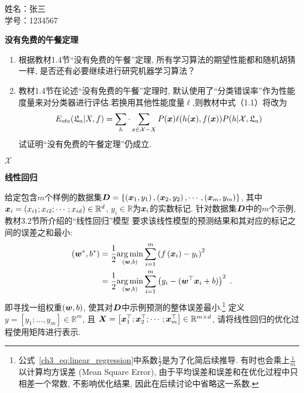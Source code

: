 \documentclass[answers]{exam}  %
\begin{document}
\Large
\noindent 
姓名：张三 \\
学号：1234567 \\
\begin{questions}
\question [20] \textbf{没有免费的午餐定理}

\begin{enumerate}
    \item 根据教材1.4节“没有免费的午餐”定理, 所有学习算法的期望性能都和随机胡猜一样, 是否还有必要继续进行研究机器学习算法？
    \item 教材1.4节在论述“没有免费的午餐”定理时, 默认使用了“分类错误率”作为性能度量来对分类器进行评估.若换用其他性能度量$\ell$,则教材中式（1.1）将改为
    \begin{equation}
        E_{ote}(\mathfrak{L}_a|X,f)=\sum_h \cdot\sum_{x\in\mathcal{X}-X}P({\boldsymbol{x}})\ell(h({\boldsymbol{x}}),f({\boldsymbol{x}}))P(h|\mathcal{X},\mathfrak{L}_a)
    \end{equation}
    试证明“没有免费的午餐定理”仍成立.
\end{enumerate}
	\begin{solution}
    $\mathcal{X}$
	\end{solution}


\question [15] \textbf{线性回归}

给定包含$m$个样例的数据集$\boldsymbol{D}=\left\{\left({\boldsymbol{x}}_{1}, y_{1}\right),\left({\boldsymbol{x}}_{2}, y_{2}\right), \cdots,\left({\boldsymbol{x}}_{m}, y_{m}\right)\right\}$, 其中${\boldsymbol{x}}_{i}=\left(x_{i 1} ; x_{i 2} ; \cdots ; x_{i d}\right) \in \mathbb{R}^{d}$, $y_{i} \in\mathbb{R}$为${\boldsymbol{x}}_{i}$的实数标记.
针对数据集$\boldsymbol{D}$中的$m$个示例, 教材3.2节所介绍的“线性回归”模型 要求该线性模型的预测结果和其对应的标记之间的误差之和最小:
\begin{align}
\left(\boldsymbol{w}^{*}, b^{*}\right) &=\frac{1}{2}\underset{(\boldsymbol{w}, b)}{\arg \min } \sum_{i=1}^{m}\left(f\left({\boldsymbol{x}}_{i}\right)-y_{i}\right)^{2} \notag\\
&=\frac{1}{2}\underset{(\boldsymbol{w}, b)}{\arg \min } \sum_{i=1}^{m}\left(y_{i}-(\boldsymbol{w}^\top {\boldsymbol{x}}_{i}+b)\right)^{2}\;.\label{ch3_eq:linear_regression}
\end{align}
即寻找一组权重$(\boldsymbol{w}, b)$, 使其对$\boldsymbol{D}$中示例预测的整体误差最小.\footnote{公式~\ref{ch3_eq:linear_regression}中系数$\frac{1}{2}$是为了化简后续推导. 有时也会乘上$\frac{1}{m}$以计算均方误差 (Mean Square Error), 由于平均误差和误差和在优化过程中只相差一个常数, 不影响优化结果, 因此在后续讨论中省略这一系数.}
定义$y=\left[y_{1}; \ldots, y_{m}\right] \in \mathbb{R}^{m}$, 且 $\boldsymbol{X}=\left[{\boldsymbol{x}}_{1}^\top ; {\boldsymbol{x}}_{2}^\top ; \cdots ; {\boldsymbol{x}}_{m}^\top\right] \in \mathbb{R}^{m \times d}$, 请将线性回归的优化过程使用矩阵进行表示.
	

\end{questions}
\end{document}
